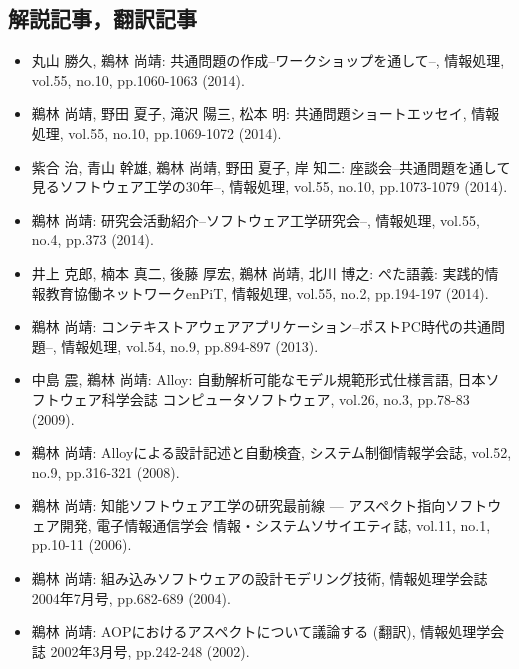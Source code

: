 \documentclass{jarticle}
\begin{document}
\subsection{解説記事，翻訳記事}

\begin{itemize}
\item 丸山 勝久, 鵜林 尚靖:
共通問題の作成--ワークショップを通して--,
情報処理, vol.55, no.10, pp.1060-1063 (2014).

\item 鵜林 尚靖, 野田 夏子, 滝沢 陽三, 松本 明:
共通問題ショートエッセイ,
情報処理, vol.55, no.10, pp.1069-1072 (2014).

\item 紫合 治, 青山 幹雄, 鵜林 尚靖, 野田 夏子, 岸 知二:
座談会--共通問題を通して見るソフトウェア工学の30年--,
情報処理, vol.55, no.10, pp.1073-1079 (2014).

\item 鵜林 尚靖:
研究会活動紹介--ソフトウェア工学研究会--,
情報処理, vol.55, no.4, pp.373 (2014).

\item 井上 克郎, 楠本 真二, 後藤 厚宏, 鵜林 尚靖, 北川 博之:
ぺた語義: 実践的情報教育協働ネットワークenPiT,
情報処理, vol.55, no.2, pp.194-197 (2014).

\item 鵜林 尚靖:
コンテキストアウェアアプリケーション--ポストPC時代の共通問題--,
情報処理, vol.54, no.9, pp.894-897 (2013).

\item 中島 震, 鵜林 尚靖:
Alloy: 自動解析可能なモデル規範形式仕様言語,
日本ソフトウェア科学会誌 コンピュータソフトウェア,
vol.26, no.3, pp.78-83 (2009).

\item 鵜林 尚靖:
Alloyによる設計記述と自動検査,
システム制御情報学会誌,
vol.52, no.9, pp.316-321 (2008).

\item 鵜林 尚靖:
知能ソフトウェア工学の研究最前線 --- アスペクト指向ソフトウェア開発,
電子情報通信学会 情報・システムソサイエティ誌,
vol.11, no.1, pp.10-11 (2006).

\item 鵜林 尚靖:
組み込みソフトウェアの設計モデリング技術,
情報処理学会誌 2004年7月号,
pp.682-689 (2004).

\item 鵜林 尚靖:
AOPにおけるアスペクトについて議論する (翻訳),
情報処理学会誌 2002年3月号,
pp.242-248 (2002).
\end{itemize}
\end{document}
